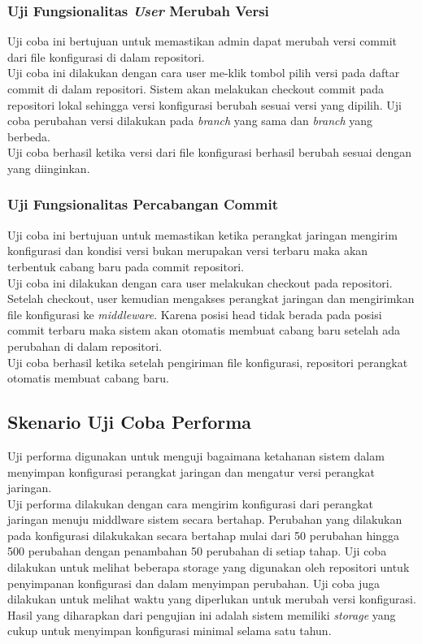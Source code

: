     	
    	\subsubsection{Uji Fungsionalitas \textit{User} Merubah Versi}
    	Uji coba ini bertujuan untuk memastikan admin dapat merubah versi commit dari file konfigurasi di dalam repositori.\\
    	\indent Uji coba ini dilakukan dengan cara user me-klik tombol pilih versi pada daftar commit di dalam repositori. Sistem akan melakukan checkout commit pada repositori lokal sehingga versi konfigurasi berubah sesuai versi yang dipilih. Uji coba perubahan versi dilakukan pada \textit{branch} yang sama dan \textit{branch} yang berbeda.\\
    	\indent Uji coba berhasil ketika versi dari file konfigurasi berhasil berubah sesuai dengan yang diinginkan.
    	
    	
    	
    	\subsubsection{Uji Fungsionalitas Percabangan Commit}
    	Uji coba ini bertujuan untuk memastikan ketika perangkat jaringan mengirim konfigurasi dan kondisi versi bukan merupakan versi terbaru maka akan terbentuk cabang baru pada commit repositori.\\
    	\indent Uji coba ini dilakukan dengan cara user melakukan checkout pada repositori. Setelah checkout, user kemudian mengakses perangkat jaringan dan mengirimkan file konfigurasi ke \textit{middleware}. Karena posisi head tidak berada pada posisi commit terbaru maka sistem akan otomatis membuat cabang baru setelah ada perubahan di dalam repositori.\\
    	\indent Uji coba berhasil ketika setelah pengiriman file konfigurasi, repositori perangkat otomatis membuat cabang baru.
    	 
    \subsection{Skenario Uji Coba Performa}
    	Uji performa digunakan untuk menguji bagaimana ketahanan sistem dalam menyimpan konfigurasi perangkat jaringan dan mengatur versi perangkat jaringan.\\
    	\indent Uji performa dilakukan dengan cara mengirim konfigurasi dari perangkat jaringan menuju middlware sistem secara bertahap. Perubahan yang dilakukan pada konfigurasi dilakukakan secara bertahap mulai dari 50 perubahan hingga 500 perubahan dengan penambahan 50 perubahan di setiap tahap. Uji coba dilakukan untuk melihat beberapa storage yang digunakan oleh repositori untuk penyimpanan konfigurasi dan dalam menyimpan perubahan. Uji coba juga dilakukan untuk melihat waktu yang diperlukan untuk merubah versi konfigurasi.\\ 
    	\indent Hasil yang diharapkan dari pengujian ini adalah sistem memiliki \textit{storage} yang cukup untuk menyimpan konfigurasi minimal selama satu tahun. 
    
